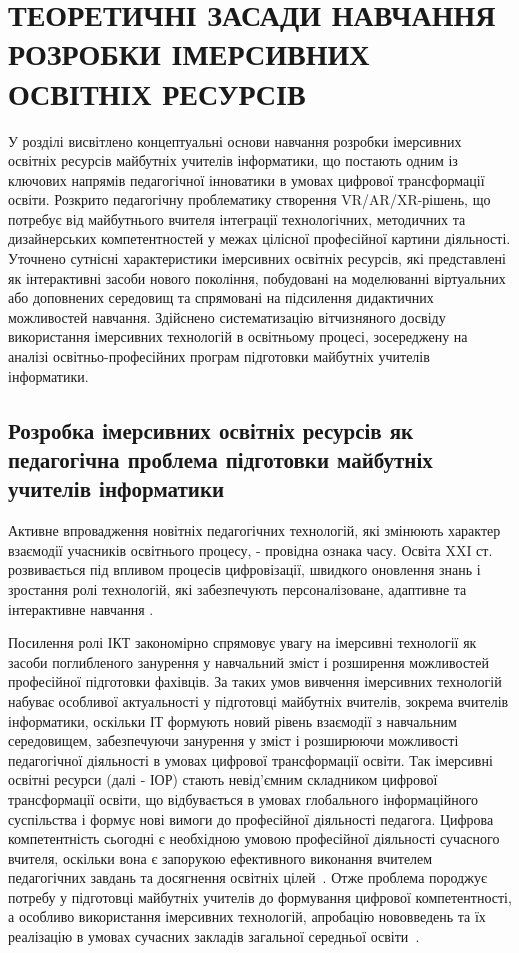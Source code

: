 \section{ТЕОРЕТИЧНІ ЗАСАДИ НАВЧАННЯ РОЗРОБКИ ІМЕРСИВНИХ ОСВІТНІХ РЕСУРСІВ}

У розділі висвітлено концептуальні основи навчання розробки імерсивних освітніх ресурсів майбутніх учителів інформатики, що постають одним із ключових напрямів педагогічної інноватики в умовах цифрової трансформації освіти. Розкрито педагогічну проблематику створення VR/AR/XR-рішень, що потребує від майбутнього вчителя інтеграції технологічних, методичних та дизайнерських компетентностей у межах цілісної професійної картини діяльності. Уточнено сутнісні характеристики імерсивних освітніх ресурсів, які представлені як інтерактивні засоби нового покоління, побудовані на моделюванні віртуальних або доповнених середовищ та спрямовані на підсилення дидактичних можливостей навчання. Здійснено систематизацію вітчизняного досвіду використання імерсивних технологій в освітньому процесі, зосереджену на аналізі освітньо-професійних програм підготовки майбутніх учителів інформатики.

\subsection{Розробка імерсивних освітніх ресурсів як педагогічна проблема підготовки майбутніх учителів інформатики}\label{subsec:1.1}

Активне впровадження новітніх педагогічних технологій, які змінюють характер взаємодії учасників освітнього процесу, - провідна ознака часу. Освіта XXI ст. розвивається під впливом процесів цифровізації, швидкого оновлення знань і зростання ролі технологій, які забезпечують персоналізоване, адаптивне та інтерактивне навчання \cite{UNESCO2021DigEd}.

Посилення ролі ІКТ закономірно спрямовує увагу на імерсивні технології як засоби поглибленого занурення у навчальний зміст і розширення можливостей професійної підготовки фахівців. За таких умов вивчення імерсивних технологій набуває особливої актуальності у підготовці майбутніх вчителів, зокрема вчителів інформатики, оскільки ІТ формують новий рівень взаємодії з навчальним середовищем, забезпечуючи занурення у зміст і розширюючи можливості педагогічної діяльності в умовах цифрової трансформації освіти. Так імерсивні освітні ресурси (далі - ІОР) стають невід'ємним складником цифрової трансформації освіти, що відбувається в умовах глобального інформаційного суспільства і формує нові вимоги до професійної діяльності педагога. Цифрова компетентність сьогодні є необхідною умовою професійної діяльності сучасного вчителя, оскільки вона є запорукою ефективного виконання вчителем педагогічних завдань та досягнення освітніх цілей~\cite[c.~194]{Kibenko2022Digital}. Отже проблема породжує потребу у підготовці майбутніх учителів до формування цифрової компетентності, а особливо використання імерсивних технологій, апробацію нововведень та їх реалізацію в умовах сучасних закладів загальної середньої освіти~\cite{Kibenko2022Digital}.

